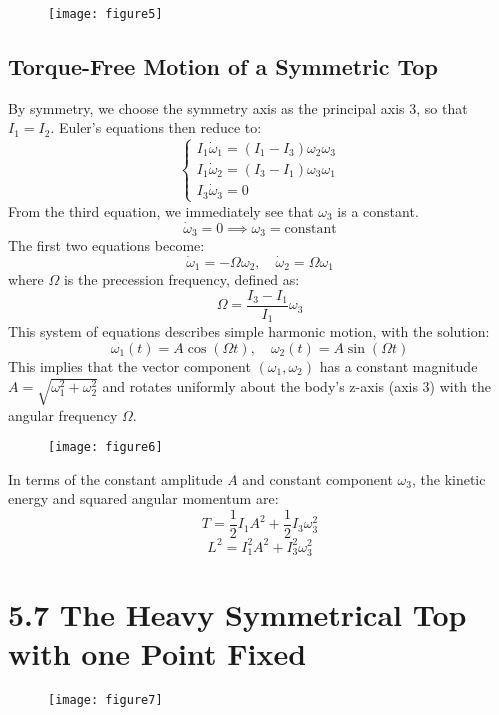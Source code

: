 \documentclass[12pt]{article}
\begin{document}
	\begin{figure}[h]
		\centering
		\texttt{[image: figure5]}
		\caption{}
		\label{fig:figure5}
	\end{figure}
	
	\subsection{Torque-Free Motion of a Symmetric Top}
	By symmetry, we choose the symmetry axis as the principal axis 3, so that $I_1 = I_2$. Euler's equations then reduce to:
	$$
	\begin{cases}
		I_1 \dot{\omega}_1 = (I_1 - I_3) \omega_2 \omega_3 \\
		I_1 \dot{\omega}_2 = (I_3 - I_1) \omega_3 \omega_1 \\
		I_3 \dot{\omega}_3 = 0
	\end{cases}
	$$
	From the third equation, we immediately see that $\omega_3$ is a constant.
	$$
	\dot{\omega}_3 = 0 \implies \omega_3 = \text{constant}
	$$
	The first two equations become:
	$$
	\dot{\omega}_1 = -\Omega \omega_2, \quad \dot{\omega}_2 = \Omega \omega_1
	$$
	where $\Omega$ is the precession frequency, defined as:
	$$
	\Omega = \frac{I_3 - I_1}{I_1} \omega_3
	$$
	This system of equations describes simple harmonic motion, with the solution:
	$$
	\omega_1(t) = A \cos(\Omega t), \quad \omega_2(t) = A \sin(\Omega t)
	$$
	This implies that the vector component $(\omega_1, \omega_2)$ has a constant magnitude $A = \sqrt{\omega_1^2 + \omega_2^2}$ and rotates uniformly about the body's z-axis (axis 3) with the angular frequency $\Omega$.
	
	\begin{figure}[h]
		\centering
		\texttt{[image: figure6]}
		\caption{}
		\label{fig:figure6}
	\end{figure}
	
	In terms of the constant amplitude $A$ and constant component $\omega_3$, the kinetic energy and squared angular momentum are:
	$$
	T = \frac{1}{2} I_1 A^2 + \frac{1}{2} I_3 \omega_3^2
	$$
	$$
	L^2 = I_1^2 A^2 + I_3^2 \omega_3^2
	$$
	
	\section*{5.7 The Heavy Symmetrical Top with one Point Fixed}
	
	\begin{figure}[h]
		\centering
		\texttt{[image: figure7]}
		\caption{}
		\label{fig:figure7}
	\end{figure}
	
\end{document}
